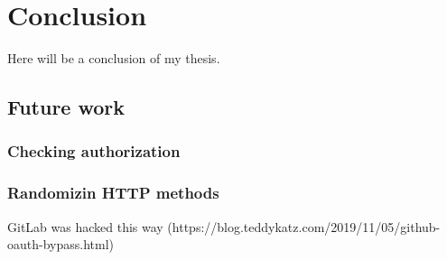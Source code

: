 \chapter{Conclusion}
Here will be a conclusion of my thesis.
\section{Future work}
\subsection{Checking authorization}
\subsection{Randomizin HTTP methods}
GitLab was hacked this way (https://blog.teddykatz.com/2019/11/05/github-oauth-bypass.html)

